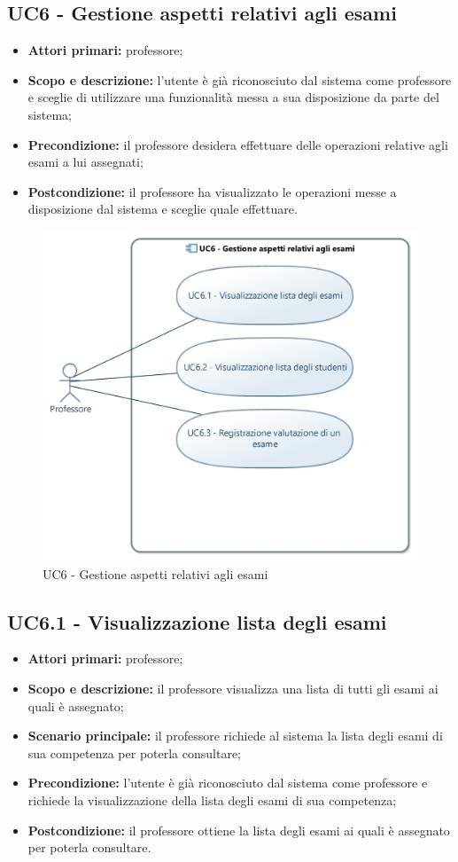 \documentclass[AnalisiDeiRequisiti.tex]{subfiles}
\begin{document}
\subsection{UC6 - Gestione aspetti relativi agli esami}
\begin{itemize}
	\item \textbf{Attori primari:} professore;
	\item \textbf{Scopo e descrizione:} l'utente è già riconosciuto dal sistema come professore e sceglie di utilizzare una funzionalità messa a sua disposizione da parte del sistema;
	\item \textbf{Precondizione:} il professore desidera effettuare delle operazioni relative agli esami a lui assegnati;
	\item \textbf{Postcondizione:} il professore ha visualizzato le operazioni messe a disposizione dal sistema e sceglie quale effettuare.
\end{itemize}

\begin{figure}[H]
	\centering
	\includegraphics[width=0.8\linewidth]{UC6.jpg}
	\caption{UC6 - Gestione aspetti relativi agli esami}
	\label{fig:UC6 - Gestione aspetti relativi agli esami}
\end{figure}

\subsection{UC6.1 - Visualizzazione lista degli esami}
\begin{itemize}
	\item \textbf{Attori primari:} professore;
	\item \textbf{Scopo e descrizione:} il professore visualizza una lista di tutti gli esami ai quali è assegnato;
	\item \textbf{Scenario principale:} il professore richiede al sistema la lista degli esami di sua competenza per poterla consultare;
	\item \textbf{Precondizione:} l'utente è già riconosciuto dal sistema come professore e richiede la visualizzazione della lista degli esami di sua competenza;
	\item \textbf{Postcondizione:} il professore ottiene la lista degli esami ai quali è assegnato per poterla consultare.
\end{itemize}
\end{document}
